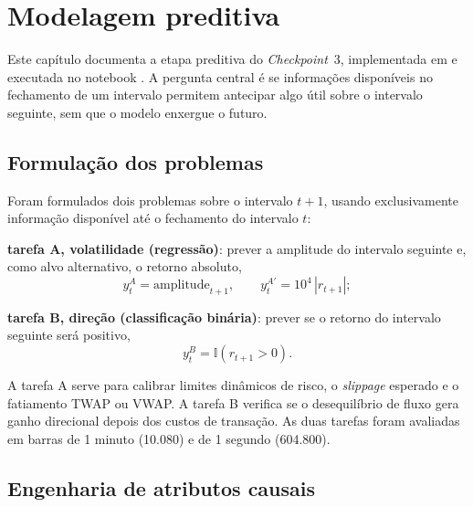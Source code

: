 \chapter{Modelagem preditiva}\label{cap:modelagem}

Este capítulo documenta a etapa preditiva do \textit{Checkpoint}~3, implementada
em  e executada no notebook
. A pergunta central é se informações
disponíveis no fechamento de um intervalo permitem antecipar algo útil sobre o
intervalo seguinte, sem que o modelo enxergue o futuro.

\section{Formulação dos problemas}\label{sec:formulacao}

Foram formulados dois problemas sobre o intervalo $t+1$, usando exclusivamente
informação disponível até o fechamento do intervalo $t$:

\begin{alineas}
  \item \textbf{tarefa A, volatilidade (regressão)}: prever a amplitude do
        intervalo seguinte e, como alvo alternativo, o retorno absoluto,
        \begin{equation}\label{eq:alvovol}
          y^{A}_t = \mathrm{amplitude}_{t+1}, \qquad
          y^{A'}_t = 10^4\,|r_{t+1}|;
        \end{equation}
  \item \textbf{tarefa B, direção (classificação binária)}: prever se o retorno
        do intervalo seguinte será positivo,
        \begin{equation}\label{eq:alvodir}
          y^{B}_t = \mathbb{I}\left(r_{t+1} > 0\right).
        \end{equation}
\end{alineas}

A tarefa A serve para calibrar limites dinâmicos de risco, o \textit{slippage}
esperado e o fatiamento TWAP ou VWAP. A tarefa B verifica se o desequilíbrio de
fluxo gera ganho direcional depois dos custos de transação. As duas tarefas
foram avaliadas em barras de 1 minuto (10.080) e de 1 segundo (604.800).

\section{Engenharia de atributos causais}\label{sec:atributos}

